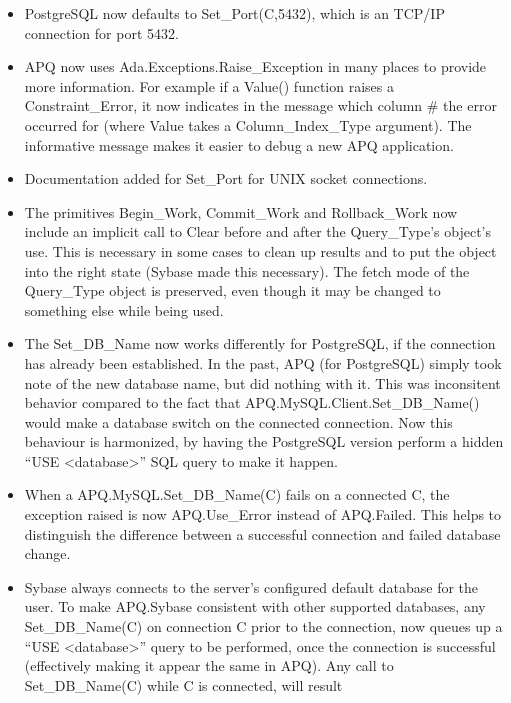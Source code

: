 \documentclass[english,letterpaper]{book}
\begin{document}
\begin{itemize}
   \item PostgreSQL now defaults to Set\_Port(C,5432), which is an TCP/IP connection
         for port 5432.
   \item APQ now uses Ada.Exceptions.Raise\_Exception in many places to provide
         more information. For example if a Value() function raises a Constraint\_Error,
         it now indicates in the message which column \# the error occurred
         for (where Value takes a Column\_Index\_Type argument). The informative
         message makes it easier to debug a new APQ application.
   \item Documentation added for Set\_Port for UNIX socket connections.
   \item The primitives Begin\_Work, Commit\_Work and Rollback\_Work now include
         an implicit call to Clear before and after the Query\_Type's object's
         use. This is necessary in some cases to clean up results and to put
         the object into the right state (Sybase made this necessary). The
         fetch mode of the Query\_Type object is preserved, even though it
         may be changed to something else while being used.
   \item The Set\_DB\_Name now works differently for PostgreSQL, if the connection
         has already been established. In the past, APQ (for PostgreSQL) simply
         took note of the new database name, but did nothing with it. This
         was inconsitent behavior compared to the fact that APQ\-.MySQL\-.Client\-.Set\_DB\_Name()
         would make a database switch on the connected connection. Now this
         behaviour is harmonized, by having the PostgreSQL version perform
         a hidden {}``USE <database>'' SQL query to make it happen.
   \item When a APQ\-.MySQL\-.Set\_DB\_Name(C) fails on a connected C, the exception
         raised is now APQ.Use\_Error instead of APQ.Failed. This helps to
         distinguish the difference between a successful connection and failed
         database change.
   \item Sybase always connects to the server's configured default database
         for the user. To make APQ.Sybase consistent with other supported databases,
         any Set\_DB\_Name(C) on connection C prior to the connection, now
         queues up a ``USE <database>'' query to be performed, once the
         connection is successful (effectively making it appear the same in
         APQ). Any call to Set\_DB\_Name(C) while C is connected, will result

\end{itemize}
\end{document}
